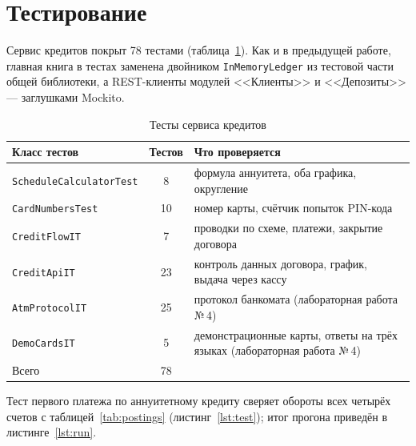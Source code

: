 \documentclass[14pt,a4paper]{extarticle}
\begin{document}
\section{Тестирование}

Сервис кредитов покрыт 78 тестами (таблица~\ref{tab:tests}). Как и в предыдущей работе,
главная книга в тестах заменена двойником \texttt{InMemoryLedger} из тестовой части
общей библиотеки, а REST-клиенты модулей <<Клиенты>> и <<Депозиты>> --- заглушками Mockito.

\begin{table}[H]
\caption{Тесты сервиса кредитов}
\label{tab:tests}
\centering
\small
\begin{tabularx}{\textwidth}{lcX}
\toprule
Класс тестов & Тестов & Что проверяется \\
\midrule
\texttt{ScheduleCalculatorTest} & 8 & формула аннуитета, оба графика, округление \\
\texttt{CardNumbersTest} & 10 & номер карты, счётчик попыток PIN-кода \\
\texttt{CreditFlowIT} & 7 & проводки по схеме, платежи, закрытие договора \\
\texttt{CreditApiIT} & 23 & контроль данных договора, график, выдача через кассу \\
\texttt{AtmProtocolIT} & 25 & протокол банкомата (лабораторная работа №\,4) \\
\texttt{DemoCardsIT} & 5 & демонстрационные карты, ответы на трёх языках (лабораторная работа №\,4) \\
\midrule
Всего & 78 & \\
\bottomrule
\end{tabularx}
\end{table}

Тест первого платежа по аннуитетному кредиту сверяет обороты всех четырёх счетов с
таблицей~\ref{tab:postings} (листинг~\ref{lst:test}); итог прогона приведён в
листинге~\ref{lst:run}.
\end{document}
